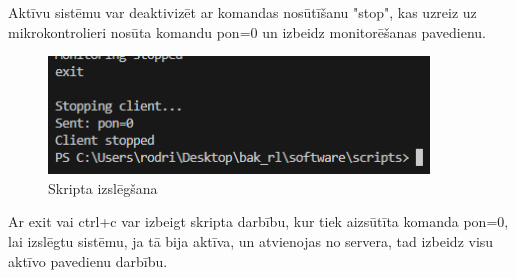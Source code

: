 Aktīvu sistēmu var deaktivizēt ar komandas nosūtīšanu "stop", kas uzreiz uz mikrokontrolieri nosūta komandu pon=0 un izbeidz monitorēšanas pavedienu.
\begin{figure}[H]
	\centering
    \includegraphics[width=0.9\textwidth]{pictures/script_exit.png}\hspace{1cm}
    \caption{Skripta izslēgšana}
\end{figure}
Ar exit vai ctrl+c var izbeigt skripta darbību, kur tiek aizsūtīta komanda pon=0, lai izslēgtu sistēmu, ja tā bija aktīva, un atvienojas no servera, tad izbeidz visu aktīvo pavedienu darbību.

